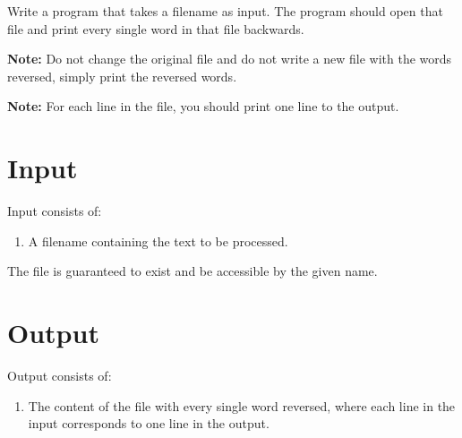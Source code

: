 
Write a program that takes a filename as input. The program should open that file and print every single word in that file backwards.

\textbf{Note:} Do not change the original file and do not write a new file with the words reversed, simply print the reversed words.

\textbf{Note:} For each line in the file, you should print one line to the output.

\section*{Input}
Input consists of:
\begin{enumerate}
    \item A filename containing the text to be processed.
\end{enumerate}
The file is guaranteed to exist and be accessible by the given name.

\section*{Output}
Output consists of:
\begin{enumerate}
    \item The content of the file with every single word reversed, where each line in the input corresponds to one line in the output.
\end{enumerate}
